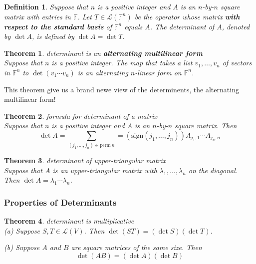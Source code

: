 \documentclass{article}
\newtheorem{theorem}{Theorem}[subsection]
\newtheorem{definition}{Definition}[subsection]
\newcommand{\FF}{\mathbb{F}}
\newcommand{\sign}{\text{sign}}
\newcommand{\perm}{\text{perm}}
\begin{document}
\begin{CJK}{UTF8}{gkai}
\begin{definition}
    Suppose that $n$ is a positive integer and $A$ is an $n$-by-$n$ square matrix with entries in $\FF$. Let $T \in \mathcal{L}(\FF^n)$ be the operator whose matrix \textbf{with respect to the standard basis} of $\FF^n$ equals $A$. The determinant of $A$, denoted by $\det A$, is defined by $\det A = \det T$.
\end{definition}

\begin{theorem}
    determinant is an \textbf{alternating multilinear form}\\

    Suppose that $n$ is a positive integer. The map that takes a list $v_1,\ldots,v_n$ of vectors in $\FF^n$ to $\det( v_1 \cdots v_n )$ is an alternating $n$-linear form on $\FF^n$.
\end{theorem}

This theorem give us a brand newe view of the determinents, the alternating multilinear form!\\

\begin{theorem}
    formula for determinant of a matrix\\

    Suppose that $n$ is a positive integer and $A$ is an $n$-by-$n$ square matrix. Then
    \[\det A = \sum_{(j_1,\ldots,j_n)\in \perm ~n} = (\sign(j_1,\ldots,j_n)) A_{j_1,1}\cdots A_{j_n,n}\]
\end{theorem}

\begin{theorem}
    determinant of upper-triangular matrix\\

    Suppose that $A$ is an upper-triangular matrix with $\lambda_1,\ldots, \lambda_n$ on the diagonal. Then $\det A = \lambda_1\cdots\lambda_n$.
\end{theorem}

\subsubsection{Properties of Determinants}

\begin{theorem}
    determinant is multiplicative\\

    (a) Suppose $S,T \in \mathcal{L}(V)$. Then $\det(ST) = (\det S)(\det T)$.

    (b) Suppose $A$ and $B$ are square matrices of the same size. Then
    \[\det(AB) = (\det A)(\det B)\]
\end{theorem}


\end{CJK}
\end{document}
